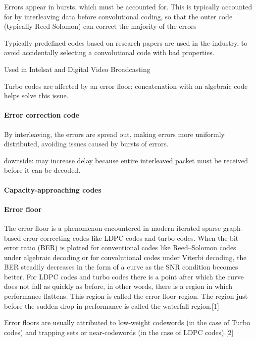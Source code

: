 \documentclass{article}
\begin{document}
Errors appear in bursts, which must be accounted for. This is typically accounted for by interleaving data before convolutional coding, so that the outer code (typically Reed-Solomon) can correct the majority of the errors

Typically predefined codes based on research papers are used in the industry, to avoid accidentally selecting a convolutional code with bad properties.

Used in Intelsat and Digital Video Broadcasting

Turbo codes are affected by an error floor: concatenation with an algebraic code helps solve this issue.

\paragraph {Error correction code}

By interleaving, the errors are spread out, making errors more uniformly distributed, avoiding issues caused by bursts of errors.

downside: may increase delay because entire interleaved packet must be received before it can be decoded.

\paragraph{Capacity-approaching codes}

\paragraph{Error floor}

The error floor is a phenomenon encountered in modern iterated sparse graph-based error correcting codes like LDPC codes and turbo codes. When the bit error ratio (BER) is plotted for conventional codes like Reed–Solomon codes under algebraic decoding or for convolutional codes under Viterbi decoding, the BER steadily decreases in the form of a curve as the SNR condition becomes better. For LDPC codes and turbo codes there is a point after which the curve does not fall as quickly as before, in other words, there is a region in which performance flattens. This region is called the error floor region. The region just before the sudden drop in performance is called the waterfall region.[1]

Error floors are usually attributed to low-weight codewords (in the case of Turbo codes) and trapping sets or near-codewords (in the case of LDPC codes).[2]
\end{document}
